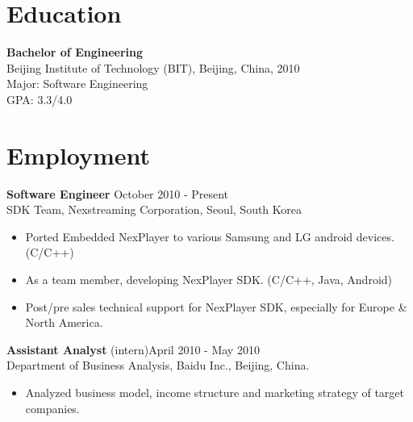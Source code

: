 \documentclass[margin]{res}
\begin{document}

\address{  Email: kimcherwoo@gmail.com\\Mobile: (+82)010-8301-0173 \\Work: (+82)02-2194-5187}
\address{  Nexstreaming Corporation \\  2nd Flr, Gwangseong Bldg, \\ 831-47Yeoksamdong Gangnam-gu \\Seoul, South Korea.\\Postcode: 135-080 }


\begin{resume}

\section{Education} {\bf Bachelor of Engineering  } \\
                Beijing Institute of Technology (BIT), Beijing, China,  2010 	\\
                Major: Software Engineering \\
                GPA: 3.3/4.0
 
\section{Employment} 
				{ \bf Software Engineer} \hfill October 2010 - Present \\
                SDK Team, Nexstreaming Corporation, Seoul, South Korea               
                 \begin{itemize}  \itemsep -2pt %
                 \item Ported Embedded NexPlayer to various Samsung and LG android devices.(C/C++)
                \item   As a team member, developing NexPlayer SDK. (C/C++, Java, Android)
				\item   Post/pre sales technical support for NexPlayer SDK, especially for Europe \& North America.
                \end{itemize}
 
                {\bf Assistant Analyst} (intern)\hfill            April 2010 - May 2010 \\
                Department of Business Analysis, Baidu Inc., Beijing, China. 
                 \begin{itemize}  \itemsep -2pt %
                 \item Analyzed business model, income structure and marketing strategy of target companies.
                 \end{itemize} 


\end{resume}
\end{document}
